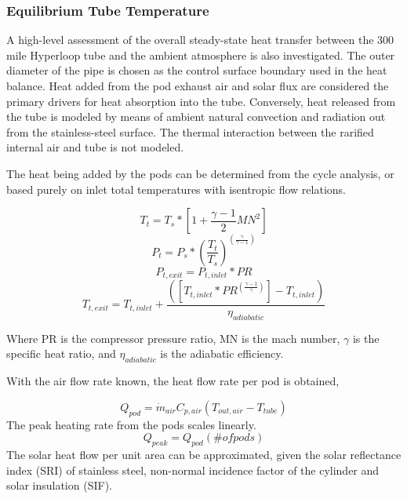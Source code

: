 \documentclass[heading.tex]{subfiles}
\begin{document}
\subsubsection{Equilibrium Tube Temperature}
A high-level assessment of the overall steady-state heat transfer between the 300 mile Hyperloop tube and the ambient atmosphere is
also investigated. The outer diameter of the pipe is chosen as the control surface boundary used in the heat balance. Heat added from the pod exhaust
air and solar flux are considered the primary drivers for heat absorption into the tube. Conversely, heat released from the tube is modeled by means of
ambient natural convection and radiation out from the stainless-steel surface. The thermal interaction between the rarified internal air and
tube is not modeled.

The heat being added by the pods can be determined from the cycle analysis, or based purely on inlet total temperatures with isentropic
flow relations.

\begin{equation*}
T_{t} = T_{s} * [1 + \frac{\gamma -1}{2} MN^2]
\end{equation*}
\begin{equation*}
P_{t} = P_{s} * (\frac{ T_{t}}{T_{s}})^(\frac{\gamma}{\gamma -1})
\end{equation*}
\begin{equation*}
P_{t,exit} = P_{t,inlet} * PR
\end{equation*}
\begin{equation*}
T_{t,exit} = T_{t,inlet} + \frac{([T_{t,inlet}*PR^{(\frac{\gamma-1}{\gamma})}] - T_{t,inlet})}  {{\eta}_{adiabatic}}
\end{equation*}

Where PR is the compressor pressure ratio, MN is the mach number,  $\gamma$ is the specific heat ratio, and  ${\eta}_{adiabatic}$ is the
adiabatic efficiency.

With the air flow rate known, the heat flow rate per pod is obtained,

\begin{equation*}
{Q}_{pod}= \dot{m}_{air} C_{p,air} (T_{out, air} - T_{tube})
\end{equation*}
The peak heating rate from the pods scales linearly.
\begin{equation*}
{Q}_{peak}= Q_{pod} (\# ofpods)
\end{equation*}
The solar heat flow per unit area can be approximated, given the solar reflectance index (SRI) of stainless steel, non-normal incidence factor
of the cylinder and solar insulation (SIF).
\end{document}
